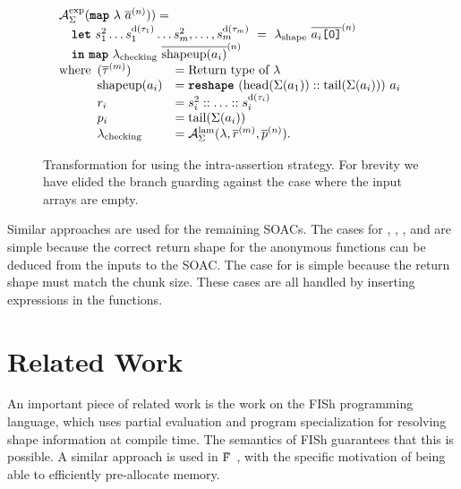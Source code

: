 \begin{figure}[t]
  \[
\begin{array}{l}
  \mathcal{A}_{\Sigma}^{\text{exp}}(\mbox{\texttt{\bfseries{map}}}~\lambda~\overline{a}^{(n)})) = \\
  \quad \mbox{\texttt{\bfseries{let}}}~s_{1}^{2} \ldots s_{1}^{\text{d}(\tau_{1})} \ldots s_{m}^{2}, \ldots, s_{m}^{\text{d}(\tau_{m})}~=~\lambda_{\text{\textrm{shape}}}~\overline{a_{i}\texttt{[0]}}^{(n)} \\
  \quad \mbox{\texttt{\bfseries{in}}}~\mbox{\texttt{\bfseries{map}}}~\lambda_{\text{checking}}~\overline{\textrm{shapeup}(a_{i})}^{(n)} \\
  \text{where}
  \begin{array}[t]{ll}
    (\overline{\tau}^{(m)}) & = \mbox{Return type of $\lambda$} \\
    \textrm{shapeup}(a_{i}) & = \mbox{\texttt{\bfseries{reshape}}}~(\textrm{head}(\Sigma(a_{1})) :: \textrm{tail}(\Sigma(a_{i})))~a_{i} \\
    r_{i} & = s_{i}^{2} :: \ldots :: s_{i}^{\text{d}(\tau_{i})} \\
    p_{i} & = \textrm{tail}(\Sigma(a_{i})) \\
    \lambda_{\text{\textrm{checking}}} & = \mathcal{A}_{\Sigma}^{\text{lam}}(\lambda,\overline{r}^{(m)},\overline{p}^{(n)}). \\

  \end{array}
\end{array}
\]

\caption{Transformation for  using the intra-assertion strategy.  For brevity we have elided the branch guarding against the case where the input arrays are empty.}
\label{fig:sizeTransformMap}
\end{figure}

Similar approaches are used for the remaining SOACs.  The cases for
, , , and  are simple
because the correct return shape for the anonymous functions can be
deduced from the inputs to the SOAC.  The case for  is
simple because the return shape must match the chunk size.  These
cases are all handled by inserting  expressions in the
functions.

\section{Related Work}

An important piece of related work is the work on the FISh \cite{fish}
programming language, which uses partial evaluation and program
specialization for resolving shape information at compile time.  The
semantics of FISh guarantees that this is possible.  A similar
approach is used in \~{F}~\cite{shaikhha2017using}, with the specific
motivation of being able to efficiently pre-allocate memory.

